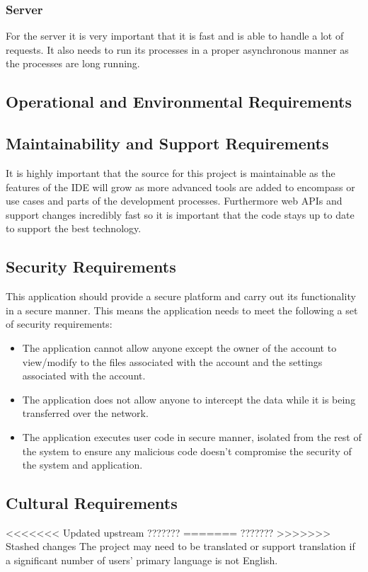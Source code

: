 \documentclass[12pt, titlepage]{article}
\begin{document}
    \subsubsection{Server}
    For the server it is very important that it is fast and is able to handle 
    a lot of requests. It also needs to run its processes in a proper 
    asynchronous manner as the processes are long running.

  \subsection{Operational and Environmental Requirements}

  \subsection{Maintainability and Support Requirements}
  It is highly important that the source for this project is maintainable as 
  the features of the IDE will grow as more advanced tools are added to 
  encompass or use cases and parts of the development processes. Furthermore 
  web APIs and support changes incredibly fast so it is important that the code
   stays up to date to support the best technology.

  \subsection{Security Requirements}
  This application should provide a secure platform and carry out its
  functionality in a secure manner. This means the application needs to meet
  the following a set of security requirements:
  \begin{itemize}
    \item The application cannot allow anyone except the owner of the account
      to view/modify to the files associated with the account and the settings
      associated with the account.
    \item The application does not allow anyone to intercept the data while it
      is being transferred over the network.
    \item The application executes user code in secure manner, isolated from
      the rest of the system to ensure any malicious code doesn't compromise
      the security of the system and application.
  \end{itemize}

  \subsection{Cultural Requirements}
<<<<<<< Updated upstream
  {\huge ???????}
=======
  \Huge ???????
>>>>>>> Stashed changes
  The project may need to be translated or support translation if a significant
  number of users' primary language is not English.
\end{document}
